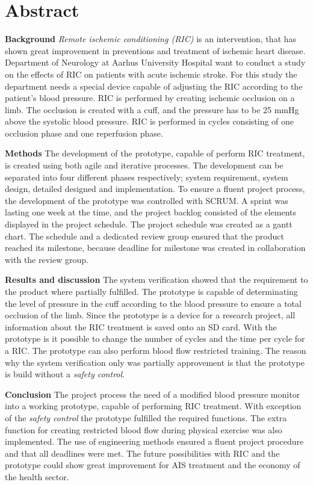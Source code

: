 \chapter*{Abstract}
\textbf{Background} \textit{Remote ischemic conditioning (RIC)} is an intervention, that has shown great improvement in preventions and treatment of ischemic heart disease. Department of Neurology at Aarhus University Hospital want to conduct a study on the effects of RIC on patients with acute ischemic stroke. For this study the department needs a special device capable of adjusting the RIC according to the patient's blood pressure. RIC is performed by creating ischemic occlusion on a limb. The occlusion is created with a cuff, and the pressure has to be 25 mmHg above the systolic blood pressure. RIC is performed in cycles consisting of one occlusion phase and one reperfusion phase. 

\textbf{Methods} The development of the prototype, capable of perform RIC treatment, is created using both agile and iterative processes. The development can be separated into four different phases respectively; system requirement, system design, detailed designed and implementation. To ensure a fluent project process, the development of the prototype was controlled with SCRUM. A sprint was lasting one week at the time, and the project backlog consisted of the elements displayed in the project schedule. The project schedule was created as a gantt chart. The schedule and a dedicated review group ensured that the product reached its milestone, because deadline for milestone was created in collaboration with the review group. 

\textbf{Results and discussion} The system verification showed that the requirement to the product where partially fulfilled. The prototype is capable of determinating the level of pressure in the cuff according to the blood pressure to ensure a total occlusion of the limb. Since the prototype is a device for a research project, all information about the RIC treatment is saved onto an SD card. With the prototype is it possible to change the number of cycles and the time per cycle for a RIC. The prototype can also perform blood flow restricted training. The reason why the system verification only was partially approvement is that the prototype is build without a \textit{safety control}. 

\textbf{Conclusion}
The project process the need of a modified blood pressure monitor into a working prototype, capable of performing RIC treatment. With exception of the \textit{safety control} the prototype fulfilled the required functions. The extra function for creating restricted blood flow during physical exercise was also implemented. The use of engineering methods ensured a fluent project procedure and that all deadlines were met. The future possibilities with RIC and the prototype could show great improvement for AIS treatment and the economy of the health sector. 